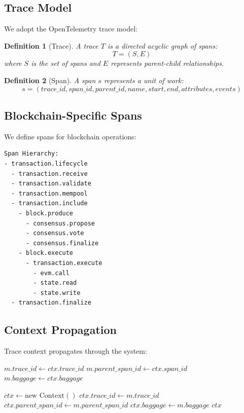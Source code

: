 \documentclass[11pt,a4paper]{article}
\newtheorem{definition}{Definition}
\begin{document}
\subsection{Trace Model}

We adopt the OpenTelemetry trace model:

\begin{definition}[Trace]
A trace $T$ is a directed acyclic graph of spans:
\[
T = (S, E)
\]
where $S$ is the set of spans and $E$ represents parent-child relationships.
\end{definition}

\begin{definition}[Span]
A span $s$ represents a unit of work:
\[
s = (trace\_id, span\_id, parent\_id, name, start, end, attributes, events)
\]
\end{definition}

\subsection{Blockchain-Specific Spans}

We define spans for blockchain operations:

\begin{lstlisting}
Span Hierarchy:
- transaction.lifecycle
  - transaction.receive
  - transaction.validate
  - transaction.mempool
  - transaction.include
    - block.produce
      - consensus.propose
      - consensus.vote
      - consensus.finalize
    - block.execute
      - transaction.execute
        - evm.call
        - state.read
        - state.write
  - transaction.finalize
\end{lstlisting}

\subsection{Context Propagation}

Trace context propagates through the system:

\begin{algorithm}
\caption{Context Propagation}
\begin{algorithmic}[1]
    \State $m.trace\_id \gets ctx.trace\_id$
    \State $m.parent\_span\_id \gets ctx.span\_id$
    \State $m.baggage \gets ctx.baggage$
\EndProcedure

    \State $ctx \gets \text{new Context}()$
    \State $ctx.trace\_id \gets m.trace\_id$
    \State $ctx.parent\_span\_id \gets m.parent\_span\_id$
    \State $ctx.baggage \gets m.baggage$
    \State \Return $ctx$
\EndProcedure
\end{algorithmic}
\end{algorithm}
\end{document}
